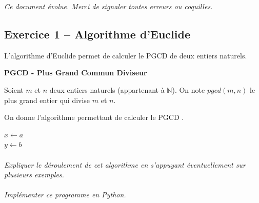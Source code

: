\documentclass[11pt,oneside]{article}
\begin{document}
\setlength{\parskip}{0ex plus 0.2ex minus 0ex}
 \renewcommand{\contentsname}{}
 \renewcommand{\baselinestretch}{1}

\tableofcontents

 \renewcommand{\baselinestretch}{1.2}
\setlength{\parskip}{2ex plus 0.5ex minus 0.2ex}

\textit{Ce document évolue. Merci de signaler toutes erreurs ou coquilles.}



\subsection*{Exercice 1 -- Algorithme d'Euclide}
L'algorithme d'Euclide permet de calculer le PGCD de deux entiers naturels. 



\begin{defi}
\textbf{PGCD - Plus Grand Commun Diviseur}

Soient $m$ et $n$ deux entiers naturels (appartenant à $\mathbb{N}$). On note $pgcd(m,n)$ le plus grand entier qui divise $m$ et $n$.
\end{defi}

On donne l'algorithme permettant de calculer le PGCD .

\begin{pseudo}
\begin{algorithm}[H]
$x\gets a$\\
$y\gets b$\\


\end{algorithm}
\end{pseudo}

\paragraph{}
\textit{Expliquer le déroulement de cet algorithme en s'appuyant éventuellement sur plusieurs exemples.}

\paragraph{}
\textit{Implémenter ce programme en Python.}
\end{document}
